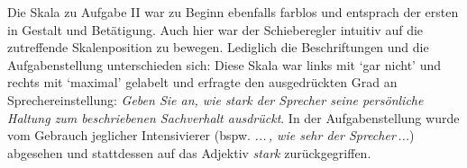 \noindent Die Skala zu Aufgabe II war zu Beginn ebenfalls farblos und entsprach der ersten in Gestalt und Betätigung. Auch hier war der Schieberegler intuitiv auf die zutreffende Skalenposition zu bewegen. Lediglich die Beschriftungen und die Aufgabenstellung unterschieden sich: Diese Skala war links mit `gar nicht' und rechts mit `maximal' gelabelt und erfragte den ausgedrückten Grad an Sprechereinstellung: \textit{Geben Sie an, wie stark der Sprecher seine persönliche Haltung zum beschriebenen Sachverhalt ausdrückt}. In der Aufgabenstellung wurde vom Gebrauch jeglicher Intensivierer (bspw. \textit{...\,, wie sehr der Sprecher\,...}) abgesehen und stattdessen auf das Adjektiv \textit{stark} zurückgegriffen.





%
%
%



